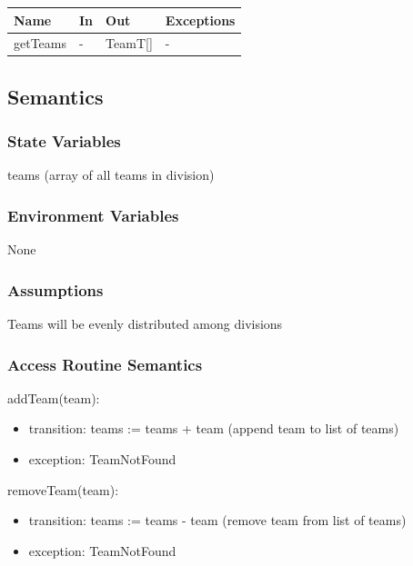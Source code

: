 \documentclass[12pt, titlepage]{article}
\begin{document}
\begin{center}
  \begin{tabular}{p{2cm} p{4cm} p{4cm} p{2cm}}
    \hline
    \textbf{Name} & \textbf{In} & \textbf{Out} & \textbf{Exceptions} \\
    \hline
    getTeams      & -           & TeamT[]      & -                   \\
    \hline
  \end{tabular}
\end{center}

\subsection{Semantics}

\subsubsection{State Variables}

teams (array of all teams in division)

\subsubsection{Environment Variables}

None

\subsubsection{Assumptions}

Teams will be evenly distributed among divisions

\subsubsection{Access Routine Semantics}

\noindent addTeam(team):
\begin{itemize}
  \item transition: teams := teams + team (append team to list of teams)
  \item exception: TeamNotFound
\end{itemize}

\noindent removeTeam(team):
\begin{itemize}
  \item transition: teams := teams - team (remove team from list of teams)
  \item exception: TeamNotFound
\end{itemize}
\end{document}
